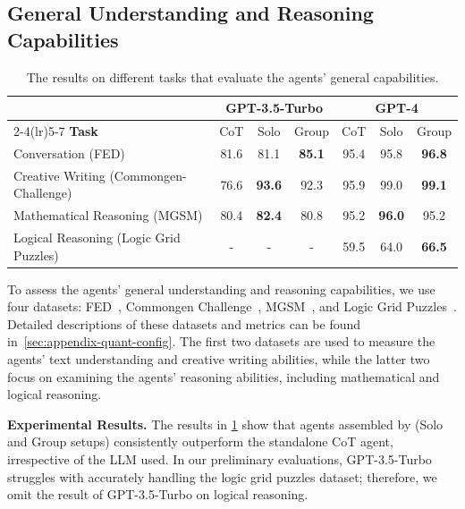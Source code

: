 \subsection{General Understanding and Reasoning Capabilities}
\label{ssec:experiment-generation-abilities}
\begin{table}[!t]
\begin{center} 
\caption{The results on different tasks that evaluate the agents' general capabilities.}
\vspace{-0.5em}
\begin{tabular}{l c c c c c c}
\toprule
& \multicolumn{3}{c}{\textbf{GPT-3.5-Turbo}} & \multicolumn{3}{c}{\textbf{GPT-4}} \\
\cmidrule(lr){2-4}\cmidrule(lr){5-7}
\textbf{Task} & CoT & Solo & Group & CoT & Solo & Group \\
\midrule
Conversation (FED)  & 81.6 & 81.1 & \textbf{85.1} & 95.4 & 95.8 & \textbf{96.8} \\
Creative Writing (Commongen-Challenge) & 76.6 & \textbf{93.6} & 92.3 & 95.9 & 99.0 & \textbf{99.1} \\
Mathematical Reasoning (MGSM)  & 80.4 & \textbf{82.4} & 80.8 & 95.2 & \textbf{96.0} & 95.2 \\
Logical Reasoning (Logic Grid Puzzles) & - & - & - & 59.5 & 64.0 & \textbf{66.5} \\
\bottomrule
\end{tabular}
\label{table:general-ability-experiment}
\vspace{-1.5em}
\end{center} 
\end{table}
To assess the agents' general understanding and reasoning capabilities, we use four datasets: FED~\citep{DBLP:conf/sigdial/MehriE20}, Commongen Challenge~\citep{DBLP:journals/corr/abs-2303-17651}, MGSM~\citep{DBLP:conf/iclr/ShiSF0SVCTRZ0W23}, and Logic Grid Puzzles~\citep{DBLP:journals/corr/abs-2206-04615}. Detailed descriptions of these datasets and metrics can be found in~\cref{sec:appendix-quant-config}. The first two datasets are used to measure the agents' text understanding and creative writing abilities, while the latter two focus on examining the agents' reasoning abilities, including mathematical and logical reasoning.

\textbf{Experimental Results.}
The results in \cref{table:general-ability-experiment} show that agents assembled by \framework (Solo and Group setups) consistently outperform the standalone CoT agent, irrespective of the LLM used. In our preliminary evaluations, GPT-3.5-Turbo struggles with accurately handling the logic grid puzzles dataset; therefore, we omit the result of GPT-3.5-Turbo on logical reasoning.

